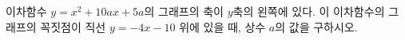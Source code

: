 \hspace*{2mm}\begin{minipage}[t]{\dimexpr\linewidth-2mm\relax}\vspace{0pt}
이차함수 $y=x^2+10ax+5a$의 그래프의 축이 $y$축의 왼쪽에 있다. 이 이차함수의 그래프의 꼭짓점이 직선 $y=-4x-10$ 위에 있을 때, 상수 $a$의 값을 구하시오.\end{minipage}
